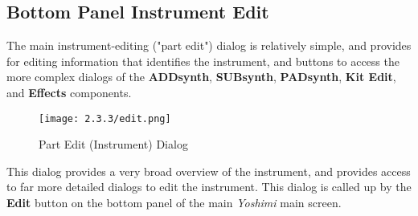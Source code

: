\subsection{Bottom Panel Instrument Edit}
\label{subsec:bottom_panel_instrument_edit}

   The main instrument-editing ("part edit")
   dialog is relatively simple, and provides for
   editing information that identifies the instrument, and buttons to access
   the more complex dialogs of the
   \textbf{ADDsynth}, \textbf{SUBsynth}, \textbf{PADsynth}, \textbf{Kit Edit},
   and \textbf{Effects} components.


\begin{figure}[H]
   \centering
   \texttt{[image: 2.3.3/edit.png]}
   \caption{Part Edit (Instrument) Dialog}
   \label{fig:instrument_edit_dialog}
\end{figure}

   This dialog provides a very broad overview of the instrument, and
   provides access to far more detailed dialogs to edit the instrument.
   This dialog is called up by the \textbf{Edit} button on the bottom panel
   of the main \textsl{Yoshimi} main screen.

